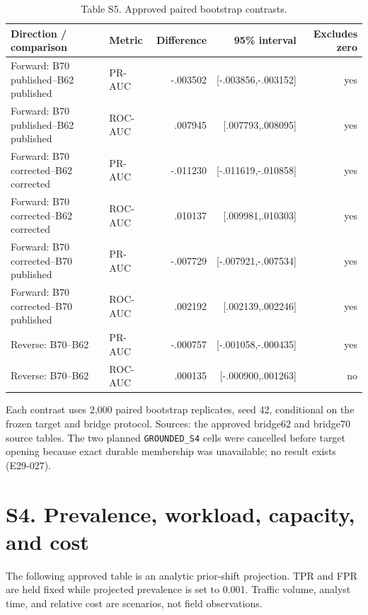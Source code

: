 \documentclass[preprint,12pt]{elsarticle}
\begin{document}
\begin{table}[htbp]
\centering\scriptsize
\caption{Table S5. Approved paired bootstrap contrasts.}
\begin{tabular}{@{}llrrr@{}}
\toprule
Direction / comparison & Metric & Difference & 95\% interval & Excludes zero\\
\midrule
Forward: B70 published--B62 published & PR-AUC & -.003502 & [-.003856,-.003152] & yes\\
Forward: B70 published--B62 published & ROC-AUC & .007945 & [.007793,.008095] & yes\\
Forward: B70 corrected--B62 corrected & PR-AUC & -.011230 & [-.011619,-.010858] & yes\\
Forward: B70 corrected--B62 corrected & ROC-AUC & .010137 & [.009981,.010303] & yes\\
Forward: B70 corrected--B70 published & PR-AUC & -.007729 & [-.007921,-.007534] & yes\\
Forward: B70 corrected--B70 published & ROC-AUC & .002192 & [.002139,.002246] & yes\\
Reverse: B70--B62 & PR-AUC & -.000757 & [-.001058,-.000435] & yes\\
Reverse: B70--B62 & ROC-AUC & .000135 & [-.000900,.001263] & no\\
\bottomrule
\end{tabular}
\end{table}
Each contrast uses 2,000 paired bootstrap replicates, seed 42, conditional on the frozen target and bridge protocol. Sources: the approved bridge62 and bridge70 source tables. The two planned \texttt{GROUNDED\_S4} cells were cancelled before target opening because exact durable membership was unavailable; no result exists (E29-027).

\section*{S4. Prevalence, workload, capacity, and cost}
The following approved table is an analytic prior-shift projection. TPR and FPR are held fixed while projected prevalence is set to 0.001. Traffic volume, analyst time, and relative cost are scenarios, not field observations.
\end{document}
